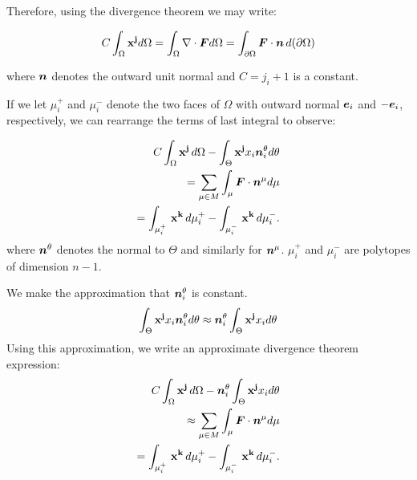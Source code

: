 Therefore, using the divergence theorem we may write: 

\begin{eqnarray}
C\int_{\Omega}  \mathbf{x}^{\mathbf {j}} d\Omega 
=\int_{\Omega}  \nabla \cdot \mbox{\boldmath $F$} d\Omega 
= \int_{\partial \Omega} \mbox{\boldmath $F$} \cdot \mbox{\boldmath $n$} \,  d(\partial \Omega) 
\label{eqn::divThm}
\end{eqnarray}

where $\mbox{\boldmath $n$}$ denotes the outward unit normal and $C = j_{i} +1$ is a constant.

 If we let $\mu^{+}_{i}$ and $\mu^{-}_{i}$ denote the two faces of $\Omega$ with outward normal ${\mbox{\boldmath $e$}}_{i}$ and $-{\mbox{\boldmath $e$}}_{i}$, respectively, we can rearrange the terms of last integral to observe:

\begin{eqnarray}
C\int_{\Omega}  \mathbf{x}^{\mathbf {j}} \, d\Omega - \int_{\Theta}\mathbf{x}^{\mathbf {j}}x_{i}\mbox{\boldmath $n$}^{\theta}_{i}  d\theta\\  =\sum_{\mu \in M}\int_{\mu}\mbox{\boldmath $F$} \cdot \mbox{\boldmath $n$}^{\mu} d\mu\\
=\int_{\mu^{+}_{i}}\, \mathbf{x}^{\mathbf {k}}\, d\mu^{+}_{i} -\int_{\mu^{-}_{i}}\,\mathbf{x}^{\mathbf {k}}  \,d\mu^{-}_{i} .
\label{eqn::twoUnkns}
\end{eqnarray}
where $\mbox{\boldmath $n$}^{\theta}$ denotes the normal to $\Theta$ and similarly for $\mbox{\boldmath $n$}^{\mu}$. 
$\mu^{+}_{i}$ and $\mu^{-}_{i}$ are polytopes of dimension $n-1$.

We make the approximation that $\mbox{\boldmath $n$}^{\theta}_{i}$ is constant.
\begin{eqnarray}
\int_{\Theta}\mathbf{x}^{\mathbf {j}}x_{i}\mbox{\boldmath $n$}^{\theta}_{i}  d\theta \approx \mbox{\boldmath $n$}^{\theta}_{i} \int_{\Theta}\mathbf{x}^{\mathbf {j}}x_{i}  d\theta
\label{eqn::approx}
\end{eqnarray}
Using this approximation, we write an approximate divergence theorem expression:
\begin{eqnarray}
C\int_{\Omega}  \mathbf{x}^{\mathbf {j}} \, d\Omega -\mbox{\boldmath $n$}^{\theta}_{i} \int_{\Theta}\mathbf{x}^{\mathbf {j}}x_{i}  d\theta\\  \approx \sum_{\mu \in M}\int_{\mu}\mbox{\boldmath $F$} \cdot \mbox{\boldmath $n$}^{\mu} d\mu\\
=\int_{\mu^{+}_{i}}\, \mathbf{x}^{\mathbf {k}}\, d\mu^{+}_{i} -\int_{\mu^{-}_{i}}\,\mathbf{x}^{\mathbf {k}}  \,d\mu^{-}_{i} .
\label{eqn::approxDivThm}
\end{eqnarray}

